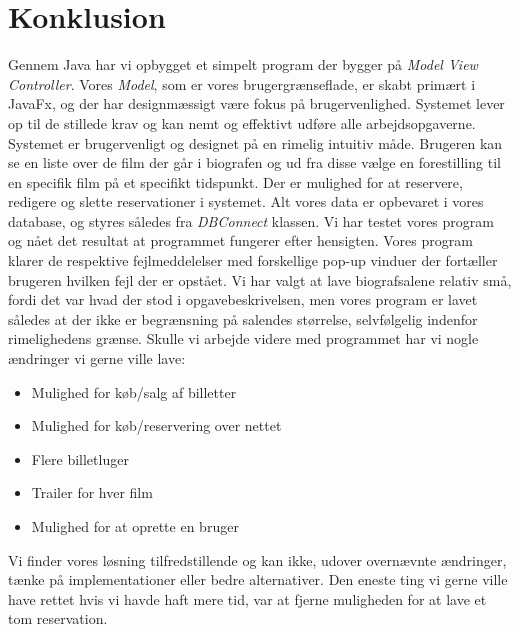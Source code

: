 \documentclass[final]{report}
\begin{document}
\chapter{Konklusion}
Gennem Java har vi opbygget et simpelt program der bygger på \emph{Model View Controller}. Vores \emph{Model}, som er vores brugergrænseflade, er skabt primært i JavaFx, og der har designmæssigt være fokus på brugervenlighed. 
Systemet lever op til de stillede krav og kan nemt og effektivt udføre alle arbejdsopgaverne. Systemet er brugervenligt og designet på en rimelig intuitiv måde. Brugeren kan se en liste over de film der går i biografen og ud fra disse vælge en forestilling til en specifik film på et specifikt tidspunkt. Der er mulighed for at reservere, redigere og slette reservationer i systemet. Alt vores data er opbevaret i vores database, og styres således fra \emph{DBConnect} klassen. Vi har testet vores program og nået det resultat at programmet fungerer efter hensigten. Vores program klarer de respektive fejlmeddelelser med forskellige pop-up vinduer der fortæller brugeren hvilken fejl der er opstået. Vi har valgt at lave biografsalene relativ små, fordi det var hvad der stod i opgavebeskrivelsen, men vores program er lavet således at der ikke er begrænsning på salendes størrelse, selvfølgelig indenfor rimelighedens grænse. Skulle vi arbejde videre med programmet har vi nogle ændringer vi gerne ville lave:

\begin{itemize}
\item Mulighed for køb/salg af billetter
\item Mulighed for køb/reservering over nettet
\item Flere billetluger
\item Trailer for hver film
\item Mulighed for at oprette en bruger
\end{itemize}

Vi finder vores løsning tilfredstillende og kan ikke, udover overnævnte ændringer, tænke på implementationer eller bedre alternativer. Den eneste ting vi gerne ville have rettet hvis vi havde haft mere tid, var at fjerne muligheden for at lave et tom reservation. 

\printbibliography

\listoffigures
\end{document}
